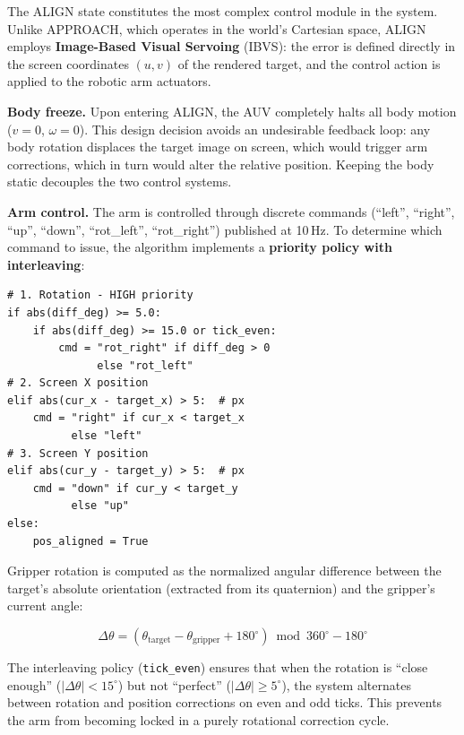\documentclass[10pt,twocolumn,letterpaper]{article}
\begin{document}
The ALIGN state constitutes the most complex control module in the system. Unlike APPROACH, which operates in the world's Cartesian space, ALIGN employs \textbf{Image-Based Visual Servoing} (IBVS): the error is defined directly in the screen coordinates $(u, v)$ of the rendered target, and the control action is applied to the robotic arm actuators.

\textbf{Body freeze.} Upon entering ALIGN, the AUV completely halts all body motion ($v = 0$, $\omega = 0$). This design decision avoids an undesirable feedback loop: any body rotation displaces the target image on screen, which would trigger arm corrections, which in turn would alter the relative position. Keeping the body static decouples the two control systems.

\textbf{Arm control.} The arm is controlled through discrete commands (``left'', ``right'', ``up'', ``down'', ``rot\_left'', ``rot\_right'') published at 10\,Hz. To determine which command to issue, the algorithm implements a \textbf{priority policy with interleaving}:

\begin{lstlisting}[caption={ALIGN state visual servoing loop.}, label={lst:align}]
# 1. Rotation - HIGH priority
if abs(diff_deg) >= 5.0:
    if abs(diff_deg) >= 15.0 or tick_even:
        cmd = "rot_right" if diff_deg > 0
              else "rot_left"
# 2. Screen X position
elif abs(cur_x - target_x) > 5:  # px
    cmd = "right" if cur_x < target_x
          else "left"
# 3. Screen Y position
elif abs(cur_y - target_y) > 5:  # px
    cmd = "down" if cur_y < target_y
          else "up"
else:
    pos_aligned = True
\end{lstlisting}

Gripper rotation is computed as the normalized angular difference between the target's absolute orientation (extracted from its quaternion) and the gripper's current angle:

\begin{equation}
\Delta\theta = \left(\theta_{\text{target}} - \theta_{\text{gripper}} + 180^{\circ}\right) \bmod 360^{\circ} - 180^{\circ}
\label{eq:gripper_rotation}
\end{equation}

The interleaving policy (\texttt{tick\_even}) ensures that when the rotation is ``close enough'' ($|\Delta\theta| < 15^{\circ}$) but not ``perfect'' ($|\Delta\theta| \geq 5^{\circ}$), the system alternates between rotation and position corrections on even and odd ticks. This prevents the arm from becoming locked in a purely rotational correction cycle.
\end{document}
